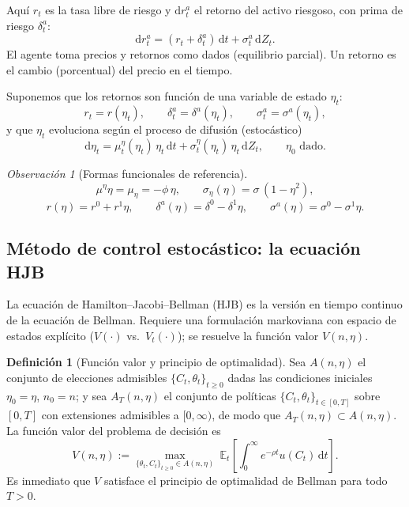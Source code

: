 \documentclass[11pt]{article}
\theoremstyle{definition}
\newtheorem{definicion}{Definición}[section]
\theoremstyle{remark}
\newtheorem*{obs}{Observación}
\newcommand{\dd}{\mathrm{d}}
\newcommand{\E}{\mathbb{E}}
\begin{document}
\medskip
Aquí $r_t$ es la tasa libre de riesgo y $\dd r_t^{a}$ el retorno del activo riesgoso, con prima de riesgo $\delta_t^{a}$:
\begin{equation}
\dd r_t^{a} = (r_t+\delta_t^{a})\,\dd t + \sigma_t^{a}\,\dd Z_t.
\end{equation}
El agente toma precios y retornos como dados (equilibrio parcial). Un retorno es el cambio (porcentual) del precio en el tiempo.

\medskip
Suponemos que los retornos son función de una variable de estado $\eta_t$:
\[
r_t = r(\eta_t),\qquad \delta_t^{a}=\delta^{a}(\eta_t),\qquad \sigma_t^{a}=\sigma^{a}(\eta_t),
\]
y que $\eta_t$ evoluciona según el proceso de difusión (estocástico)
\begin{equation}
\dd\eta_t = \mu_t^{\eta}(\eta_t)\,\eta_t\,\dd t + \sigma_t^{\eta}(\eta_t)\,\eta_t\,\dd Z_t,
\qquad \eta_0 \text{ dado.}
\end{equation}

\begin{obs}[Formas funcionales de referencia]
\[
\mu^{\eta}\eta=\mu_\eta=-\phi\,\eta,\qquad
\sigma_\eta(\eta)=\sigma\,(1-\eta^2),
\]
\[
r(\eta)=r^{0}+r^{1}\eta,\qquad
\delta^{a}(\eta)=\delta^{0}-\delta^{1}\eta,\qquad
\sigma^{a}(\eta)=\sigma^{0}-\sigma^{1}\eta.
\]
\end{obs}

\subsection{Método de control estocástico: la ecuación HJB}

La ecuación de Hamilton--Jacobi--Bellman (HJB) es la versión en tiempo continuo de la ecuación de Bellman. Requiere una formulación markoviana con espacio de estados explícito ($V(\cdot)$ vs.\ $V_t(\cdot)$); se resuelve la función valor $V(n,\eta)$.

\begin{definicion}[Función valor y principio de optimalidad]
Sea $A(n,\eta)$ el conjunto de elecciones admisibles $\{C_t,\theta_t\}_{t\ge0}$ dadas las condiciones iniciales $\eta_0=\eta$, $n_0=n$; y sea $A_T(n,\eta)$ el conjunto de políticas $\{C_t,\theta_t\}_{t\in[0,T]}$ sobre $[0,T]$ con extensiones admisibles a $[0,\infty)$, de modo que $A_T(n,\eta)\subset A(n,\eta)$. La función valor del problema de decisión es
\begin{equation}
V(n,\eta):=\max_{\{\theta_t,C_t\}_{t\ge0}\in A(n,\eta)}\ \E_t\!\left[\int_0^\infty e^{-\rho t}u(C_t)\,\dd t\right].
\end{equation}
Es inmediato que $V$ satisface el principio de optimalidad de Bellman para todo $T>0$.
\end{definicion}
\end{document}
